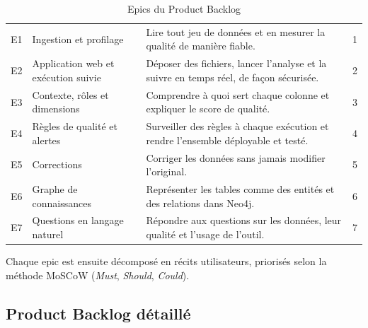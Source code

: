 \begin{table}[H]
\centering
\small
\begin{tabular}{|C{1.1cm}|L{4.6cm}|L{6.6cm}|C{1.5cm}|}
\hline
{} &  &  &  \\ \hline
E1 & Ingestion et profilage & Lire tout jeu de données et en mesurer la qualité de manière fiable. & 1 \\ \hline
E2 & Application web et exécution suivie & Déposer des fichiers, lancer l'analyse et la suivre en temps réel, de façon sécurisée. & 2 \\ \hline
E3 & Contexte, rôles et dimensions & Comprendre à quoi sert chaque colonne et expliquer le score de qualité. & 3 \\ \hline
E4 & Règles de qualité et alertes & Surveiller des règles à chaque exécution et rendre l'ensemble déployable et testé. & 4 \\ \hline
E5 & Corrections & Corriger les données sans jamais modifier l'original. & 5 \\ \hline
E6 & Graphe de connaissances & Représenter les tables comme des entités et des relations dans Neo4j. & 6 \\ \hline
E7 & Questions en langage naturel & Répondre aux questions sur les données, leur qualité et l'usage de l'outil. & 7 \\ \hline
\end{tabular}
\caption{Epics du Product Backlog}
\label{tab:epics}
\end{table}

Chaque epic est ensuite décomposé en récits utilisateurs, priorisés selon la méthode MoSCoW (\textit{Must}, \textit{Should}, \textit{Could}).

\subsection{Product Backlog détaillé}

